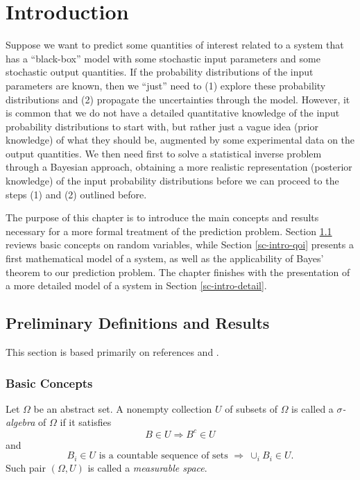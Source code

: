 \chapter{Introduction}\label{ch-int}
\thispagestyle{headings}

Suppose we want to predict some quantities of interest related to a system that
has a ``black-box'' model with
some stochastic input parameters and
some stochastic output quantities.
If the probability distributions of the input parameters are known, then we ``just'' need to
(1) explore these probability distributions and (2) propagate the uncertainties through the model.
However, it is common that we do not have a detailed quantitative knowledge of the input probability distributions to start with,
but rather just a vague idea (prior knowledge) of what they should be, augmented by some experimental data on the output quantities.
We then need first to solve a statistical inverse problem through a Bayesian approach, obtaining a more realistic representation
(posterior knowledge) of the input probability distributions before we can proceed to the steps (1) and (2) outlined before.

The purpose of this chapter is to introduce the main concepts and results necessary for
a more formal treatment of the prediction problem.
Section \ref{sc-intro-prelim} reviews basic concepts on random variables, while
Section \ref{sc-intro-qoi} presents a first mathematical model of a system, as well as the applicability of Bayes' theorem to our prediction problem.
The chapter finishes with the presentation of a more detailed model of a system in Section \ref{sc-intro-detail}.

\section{Preliminary Definitions and Results}\label{sc-intro-prelim}

This section is based primarily on references \cite{Du05} and \cite{JaPr04}.

\subsection{Basic Concepts}\label{subsc-intro-prelim-basic}

Let $\Omega$ be an abstract set. A nonempty collection $U$ of subsets of $\Omega$ is called a {\it $\sigma$-algebra} of $\Omega$ if it satisfies
\begin{equation*}
B\in U \Rightarrow B^c\in U
\end{equation*}
and
\begin{equation*}
B_i\in U\text{ is a countable sequence of sets }\Rightarrow~\cup_iB_i\in U.
\end{equation*}
Such pair $(\Omega,U)$ is called a {\it measurable space}.

